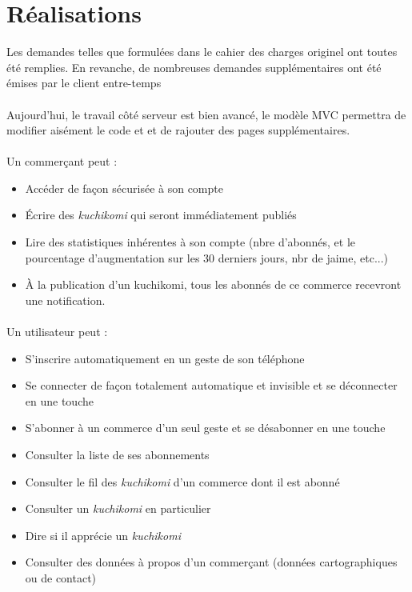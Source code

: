 \documentclass[a4paper,12pt,titlepage]{report}
\begin{document}
\section{Réalisations}

Les demandes telles que formulées dans le cahier des charges originel ont toutes été remplies. En revanche, de nombreuses demandes supplémentaires ont été émises par le client entre-temps

\paragraph*{}
Aujourd'hui, le travail côté serveur est bien avancé, le modèle MVC permettra de modifier aisément le code et et de rajouter des pages supplémentaires.

\paragraph*{}
Un commerçant peut :
\begin{itemize}
\item Accéder de façon sécurisée à son compte
\item Écrire des \emph{kuchikomi} qui seront immédiatement publiés
\item Lire des statistiques inhérentes à son compte (nbre d'abonnés, et le pourcentage d'augmentation sur les 30 derniers jours, nbr de jaime, etc...)
\item À la publication d'un kuchikomi, tous les abonnés de ce commerce recevront une notification.
\end{itemize}

\paragraph*{}
Un utilisateur peut :
\begin{itemize}
\item S'inscrire automatiquement en un geste de son téléphone
\item Se connecter de façon totalement automatique et invisible et se déconnecter en une touche
\item S'abonner à un commerce d'un seul geste et se désabonner en une touche
\item Consulter la liste de ses abonnements
\item Consulter le fil des \emph{kuchikomi} d'un commerce dont il est abonné
\item Consulter un \emph{kuchikomi} en particulier
\item Dire si il apprécie un \emph{kuchikomi}
\item Consulter des données à propos d'un commerçant (données cartographiques ou de contact)
\end{itemize}
\end{document}

